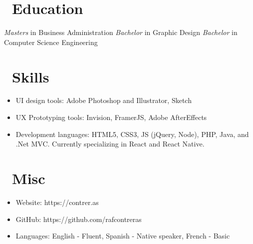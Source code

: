 \documentclass{resume}
\begin{document}
\section{\faGraduationCap\ Education}
\textit{Masters} in Business Administration
\textit{Bachelor} in Graphic Design
\textit{Bachelor} in Computer Science Engineering

\section{\faCogs\ Skills}
\begin{itemize}[parsep=0.5ex]
  \item UI design tools: Adobe Photoshop and Illustrator, Sketch
  \item UX Prototyping tools: Invision, FramerJS, Adobe AfterEffects
  \item Development languages: HTML5, CSS3, JS (jQuery, Node), PHP, Java, and .Net MVC. Currently specializing in React and React Native.
\end{itemize}

\section{\faInfo\ Misc}
\begin{itemize}[parsep=0.5ex]
  \item Website: https://contrer.as
  \item GitHub: https://github.com/rafcontreras
  \item Languages: English - Fluent, Spanish - Native speaker, French - Basic
\end{itemize}

%
%
\end{document}
